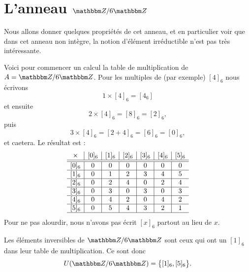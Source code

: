 \section{L'anneau \texorpdfstring{$ \eZ/6\eZ$}{Z/6Z}}
\label{SECooSWGKooEeOZTO}

Nous allons donner quelques propriétés de cet anneau, et en particulier voir que dans cet anneau non intègre, la notion d'élément irréductible n'est pas très intéressante.

Voici pour commencer un calcul la table de multiplication de \( A=\eZ/6\eZ\). Pour les multiples de (par exemple) \( [4]_6\) nous écrivons
\begin{equation}
    1\times [4]_6=[4_6]
\end{equation}
et ensuite
\begin{equation}
    2\times [4]_6=[8]_6=[2]_6,
\end{equation}
puis
\begin{equation}
    3\times [4]_6=[2+4]_6=[6]_6=[0]_6,
\end{equation}
et caetera. Le résultat est :
\begin{equation}
\begin{array}{c|c|c|c|c|c|c}
    \times & [0]_6 & [1]_6  & [2]_6  & [3]_6 & [4]_6 & [5]_6  \\
\hline\hline
[0]_6 & 0 & 0 & 0 & 0 & 0 & 0 \\ 
\hline
[1]_6  & 0 & 1 & 2 & 3 & 4 & 5 \\ 
\hline
[2]_6 & 0 & 2 & 4 & 0 & 2 & 4 \\ 
\hline
[3]_6 & 0 & 3 & 0 & 3 & 0 & 3 \\ 
\hline
[4]_6 & 0 & 4 & 2 & 0 & 4 & 2 \\ 
\hline
[5]_6 & 0 & 5 & 4 & 3 & 2 & 1 \\ 
\hline
\end{array}
\end{equation}
Pour ne pas alourdir, nous n'avons pas écrit \( [x]_6\) partout au lieu de \( x\).

\begin{normaltext}[Inversibles]
    Les éléments inversibles de \( \eZ/6\eZ\) sont ceux qui ont un \( [1]_6\) dans leur table de multiplication. Ce sont donc
    \begin{equation}
        U(\eZ/6\eZ)=\big\{ [1]_6,[5]_6 \big\}.
    \end{equation}
\end{normaltext}

